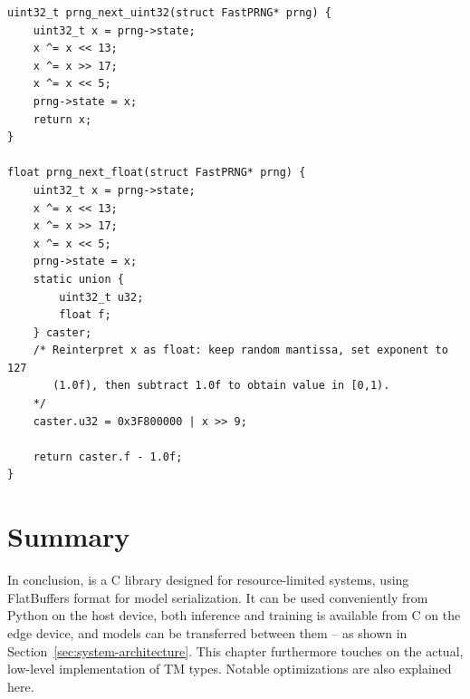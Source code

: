 \begin{listing}[!htbp]
    \caption[\LibraryName implementation of \texttt{xorshift32}]{\LibraryName implementation of \texttt{xorshift32}\label{lst:fast-prng}}
    \begin{verbatim}
uint32_t prng_next_uint32(struct FastPRNG* prng) {
    uint32_t x = prng->state;
    x ^= x << 13;
    x ^= x >> 17;
    x ^= x << 5;
    prng->state = x;
    return x;
}

float prng_next_float(struct FastPRNG* prng) {
    uint32_t x = prng->state;
    x ^= x << 13;
    x ^= x >> 17;
    x ^= x << 5;
    prng->state = x;
    static union {
        uint32_t u32;
        float f;
    } caster;
    /* Reinterpret x as float: keep random mantissa, set exponent to 127
       (1.0f), then subtract 1.0f to obtain value in [0,1).
    */
    caster.u32 = 0x3F800000 | x >> 9;

    return caster.f - 1.0f;
}
    \end{verbatim}
\end{listing}


\section{Summary}
In conclusion, \LibraryName is a C library designed for resource-limited systems, using FlatBuffers format for model serialization. It can be used conveniently from Python on the host device, both inference and training is available from C on the edge device, and models can be transferred between them -- as shown in Section~\ref{sec:system-architecture}. 
This chapter furthermore touches on the actual, low-level implementation of TM types. Notable optimizations are also explained here.
